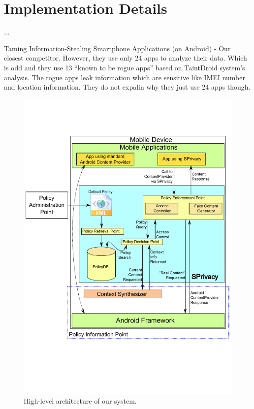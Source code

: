 \section{Implementation Details}
...

Taming Information-Stealing Smartphone Applications (on Android) - Our closest competitor. However, they use only 24 apps to analyze their data. Which is odd and they use 13 ``known to be rogue apps'' based on TaintDroid system's analysis. The rogue apps leak information which are sensitive like IMEI number and location information. They do not expalin why they just use 24 apps though.

\begin{figure}[!htb]
	\centering
	\includegraphics[width=0.9\columnwidth]{images/AppModProc}
	\caption{High-level architecture of our system.}
	\label{fig:appmodproc}
\end{figure}